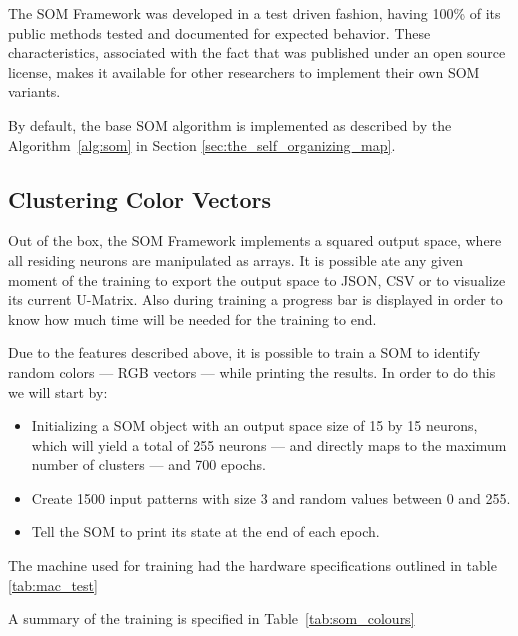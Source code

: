 The \ac{SOM} Framework was developed in a test driven fashion, having 100\% of its public methods tested and documented for expected behavior. These characteristics, associated with the fact that was published under an open source license, makes it available for other researchers to implement their own SOM variants.

By default, the base SOM algorithm is implemented as described by the Algorithm~\ref{alg:som} in Section \ref{sec:the_self_organizing_map}. 
\subsection{Clustering Color Vectors}
\label{sub:main_features}
Out of the box, the \ac{SOM} Framework implements a squared output space, where all residing neurons are manipulated as arrays. It is possible ate any given moment of the training to export the output space to \ac{JSON}, \ac{CSV} or to visualize its current \ac{U-Matrix}. Also during training a progress bar is displayed in order to know how much time will be needed for the training to end.

Due to the features described above, it is possible to train a \ac{SOM} to identify random colors --- RGB vectors --- while printing the results. In order to do this we will start by:
\begin{itemize}
  \item Initializing a SOM object with an output space size of 15 by 15 neurons, which will yield a total of 255 neurons --- and directly maps to the maximum number of clusters --- and 700 epochs.
  \item Create 1500 input patterns with size 3 and random values between 0 and 255. 
  \item Tell the SOM to print its state at the end of each epoch.
\end{itemize}
The machine used for training had the hardware specifications outlined in table \ref{tab:mac_test}



A summary of the training is specified in Table~\ref{tab:som_colours}


